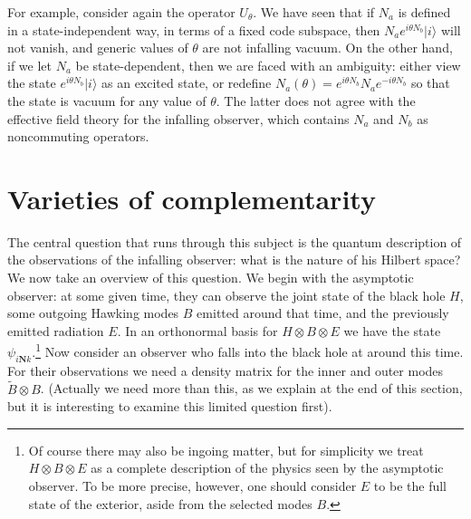 \documentclass[12pt]{article}
\newcommand{\sect}[1]{\section{#1}\setcounter{equation}{0}}
\begin{document}
{For example, consider again the operator $U_\theta$.  We have seen that
if  $N_a$ is defined in a state-independent way, in terms of a fixed code subspace, then $N_a e^{i\theta N_b}|i\rangle$ will not vanish, and %
generic values of $\theta$ are not infalling vacuum. On the other hand, if we let $N_a$ be state-dependent, then we are faced with an ambiguity: either view the state
$e^{i\theta N_b}|i\rangle$ as an excited state, or redefine $N_{a}(\theta) = e^{i\theta N_b}N_a e^{-i\theta N_b}$ so that the state is vacuum for any value of $\theta$.  The latter does not agree with the effective field theory for the infalling observer, which contains $N_a$ and $N_b$ as noncommuting operators.



\sect{Varieties of complementarity}

The central question that runs through this subject is the quantum description of the observations of the infalling observer: what  is the nature of his Hilbert space?   We now take an overview of this question.  We begin with the asymptotic observer: at some given time, they can observe the joint state of the black hole $H$, some outgoing Hawking modes $B$ emitted around that time, and the previously emitted radiation $E$.  In an orthonormal basis for $H \otimes B \otimes E$ we have the state $\psi_{i\pmb Nk}$.\footnote{Of course there may also be ingoing matter, but for simplicity we treat $H \otimes B \otimes E$ as a complete description of the physics seen by the asymptotic observer.  To be more precise, however, one should consider $E$ to be the full state of the exterior, aside from the selected modes $B$.}
Now consider an observer who falls into the black hole at around this time.  For their observations we need a density matrix for the inner and outer modes $\tilde B \otimes B$.  {(Actually we need more than this, as we explain at the end of this section, but it is interesting to examine this limited question first).}

}
\end{document}
